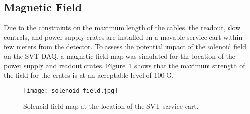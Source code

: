 \subsection{Magnetic Field}

Due to the constraints on the maximum length of the cables, the readout, slow controls, and power supply crates are installed on a movable service cart within few meters from the detector. To assess the potential impact of the solenoid field on the SVT DAQ, a magnetic field map was simulated for the location of the power supply and readout crates. Figure~\ref{fig:solenoid-field} shows that the maximum strength of the field for the crates is at an acceptable level of 100 G.

\begin{figure}[hbt] 
\centering 
\texttt{[image: solenoid-field.jpg]}
\caption{Solenoid field map at the location of the SVT service cart.}
\label{fig:solenoid-field}
\end{figure}



